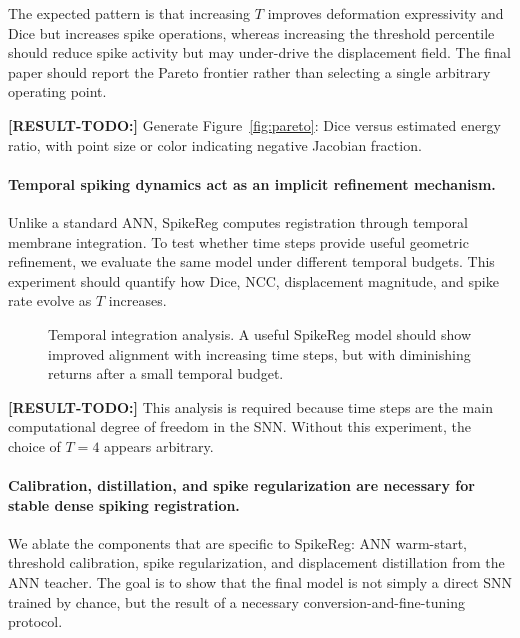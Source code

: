 The expected pattern is that increasing $T$ improves deformation expressivity and Dice but increases spike operations, whereas increasing the threshold percentile should reduce spike activity but may under-drive the displacement field. The final paper should report the Pareto frontier rather than selecting a single arbitrary operating point.

\textbf{[RESULT-TODO:]} Generate Figure~\ref{fig:pareto}: Dice versus estimated energy ratio, with point size or color indicating negative Jacobian fraction.


\paragraph{Temporal spiking dynamics act as an implicit refinement mechanism.}
Unlike a standard ANN, SpikeReg computes registration through temporal membrane integration. To test whether time steps provide useful geometric refinement, we evaluate the same model under different temporal budgets. This experiment should quantify how Dice, NCC, displacement magnitude, and spike rate evolve as $T$ increases.

\begin{figure}[t]
\centering
{}
\caption{
Temporal integration analysis. 
A useful SpikeReg model should show improved alignment with increasing time steps, but with diminishing returns after a small temporal budget.
}
\label{fig:temporal}
\end{figure}

\textbf{[RESULT-TODO:]} This analysis is required because time steps are the main computational degree of freedom in the SNN. Without this experiment, the choice of $T=4$ appears arbitrary.


\paragraph{Calibration, distillation, and spike regularization are necessary for stable dense spiking registration.}
We ablate the components that are specific to SpikeReg: ANN warm-start, threshold calibration, spike regularization, and displacement distillation from the ANN teacher. The goal is to show that the final model is not simply a direct SNN trained by chance, but the result of a necessary conversion-and-fine-tuning protocol.


